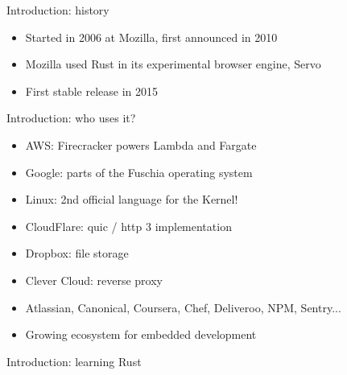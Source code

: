     \begin{frame}{Introduction: history}
        \begin{itemize}
            \item Started in 2006 at Mozilla, first announced in 2010
            \item Mozilla used Rust in its experimental browser engine, Servo
            \item First stable release in 2015
        \end{itemize}
    \end{frame}

    \begin{frame}{Introduction: who uses it?}
        \begin{itemize}
            \item AWS: Firecracker powers Lambda and Fargate
            \item Google: parts of the Fuschia operating system
            \item Linux: 2nd official language for the Kernel!
            \item CloudFlare: quic / http 3 implementation
            \item Dropbox: file storage
            \item Clever Cloud: reverse proxy
            \item Atlassian, Canonical, Coursera, Chef, Deliveroo, NPM, Sentry...
            \item Growing ecosystem for embedded development
        \end{itemize}
    \end{frame}

    \begin{frame}{Introduction: learning Rust}
        
    \end{frame}